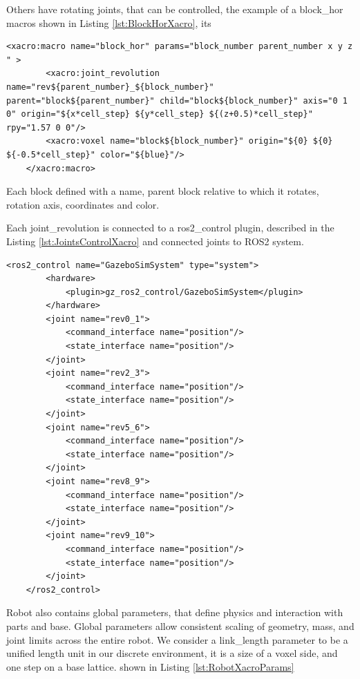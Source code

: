 Others have rotating joints, that can be controlled,
the example of a block\_hor macros shown in Listing \ref{lst:BlockHorXacro}, its 


\begin{lstlisting}[language=xacro, caption={Block type block\_hor as a macros }, label={lst:BlockHorXacro}]
    <xacro:macro name="block_hor" params="block_number parent_number x y z " >
        <xacro:joint_revolution name="rev${parent_number}_${block_number}" parent="block${parent_number}" child="block${block_number}" axis="0 1 0" origin="${x*cell_step} ${y*cell_step} ${(z+0.5)*cell_step}" rpy="1.57 0 0"/>
        <xacro:voxel name="block${block_number}" origin="${0} ${0} ${-0.5*cell_step}" color="${blue}"/>
    </xacro:macro>
\end{lstlisting}
Each block  defined with a name, parent block relative to which it rotates,
rotation axis, coordinates and color.


Each joint\_revolution is connected to a ros2\_control plugin,
described in the Listing \ref{lst:JointsControlXacro} and connected joints to ROS2 system.

\begin{lstlisting}[language=xacro, caption={Block type block\_hor as a macros }, 
    label={lst:JointsControlXacro}]
    <ros2_control name="GazeboSimSystem" type="system">
        <hardware>
            <plugin>gz_ros2_control/GazeboSimSystem</plugin>
        </hardware>
        <joint name="rev0_1">
            <command_interface name="position"/>
            <state_interface name="position"/>
        </joint>
        <joint name="rev2_3">
            <command_interface name="position"/>
            <state_interface name="position"/>
        </joint>
        <joint name="rev5_6">
            <command_interface name="position"/>
            <state_interface name="position"/>
        </joint>
        <joint name="rev8_9">
            <command_interface name="position"/>
            <state_interface name="position"/>
        </joint>
        <joint name="rev9_10">
            <command_interface name="position"/>
            <state_interface name="position"/>
        </joint>
    </ros2_control>
\end{lstlisting}

Robot also contains global parameters, that define physics and 
interaction with parts and base. Global parameters
allow consistent scaling of geometry, mass, and joint limits 
across the entire robot. 
We consider a link\_length parameter 
to be a unified length unit in our discrete environment, it is a 
size of a voxel side, and one step on a base lattice.
shown in Listing  \ref{lst:RobotXacroParams}

